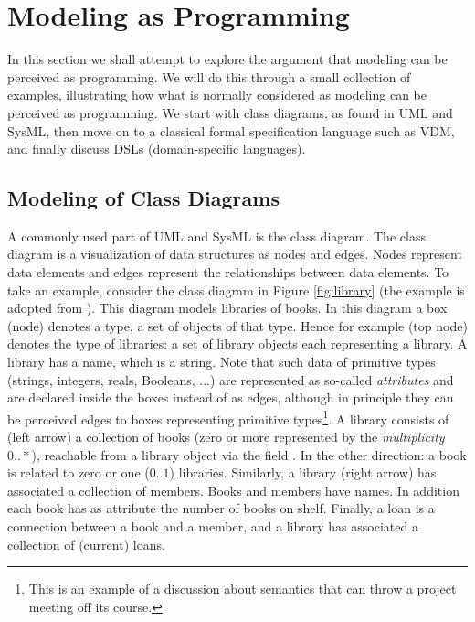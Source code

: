 
\section{Modeling as Programming}
\label{sec:modeling-as-programming}

In this section we shall attempt to explore the argument that
modeling can be perceived as programming. We will do this through
a small collection of examples, illustrating how what is normally
considered as modeling can be perceived as programming. We start
with class diagrams, as found in UML and SysML, then move on to
a classical formal specification language such as VDM, and finally discuss DSLs (domain-specific languages).

\subsection{Modeling of Class Diagrams}
\label{sec:complex-classes-in-scala}

A commonly used part of UML and SysML is the class diagram. The class diagram is a visualization of data structures as nodes and edges. Nodes represent data elements and edges represent the relationships between data elements. To take an
example, consider the class diagram in Figure \ref{fig:library}
(the example is adopted from \cite{?}). This diagram models libraries of books. In this diagram a box (node) denotes a type, a set of objects of that type. Hence for example  
(top node) denotes the type of libraries: a set
of library objects each representing a library.
A library has a name, which is a string. Note that
such data of primitive types (strings, integers, reals, Booleans, ...) are represented as so-called {\em attributes} and are declared inside the boxes instead of as edges, although in principle they can be perceived edges to boxes representing primitive types\footnote{This is an example of a discussion
about semantics that can throw a project meeting off its course.}. 
A library consists of (left arrow) 
a collection of books (zero or more represented by 
the {\em multiplicity} $0 .. *$),
reachable from a library object via the field . In the other direction: a book is related to zero or one ($0 .. 1$) libraries.
Similarly, a library (right arrow) has associated a collection of
members. Books and members have names. In addition each book has as
attribute the number of books on shelf. Finally, a loan is a 
connection between a book and a member, and a library has 
associated a collection of (current) loans.

